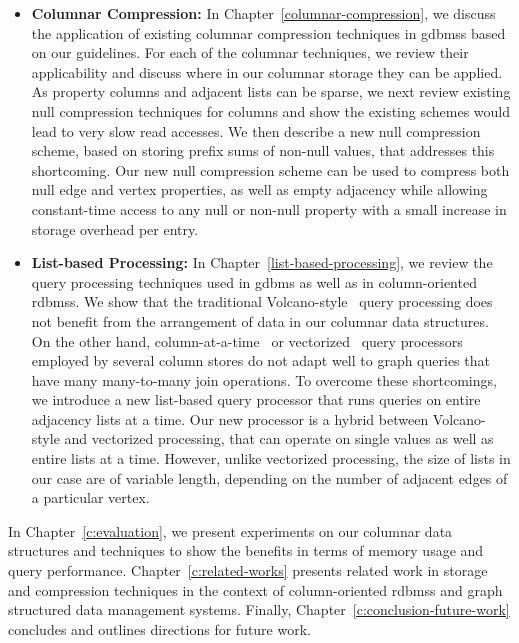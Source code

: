 \begin{itemize}
	\item \textbf{Columnar Compression:} In Chapter~\ref{columnar-compression}, we discuss the application of existing columnar compression techniques in \gls{gdbms}s based on our guidelines. For each of the columnar techniques, we review their applicability and discuss where in our columnar storage they can be applied. As property columns and adjacent lists can be sparse, we next review existing null compression techniques for columns and show the existing schemes would lead to very slow read accesses. We then describe a new null compression scheme, based on storing prefix sums of non-null values, that addresses this shortcoming. Our new null compression scheme can be used to compress both null edge and vertex properties, as well as empty adjacency while allowing constant-time access to any null or non-null property with a small increase in storage overhead per entry. 
	
	\item \textbf{List-based Processing:} In Chapter~\ref{list-based-processing}, we review the query processing techniques used in \gls{gdbms} as well as in column-oriented \gls{rdbms}s. We show that the traditional  Volcano-style~\cite{volcano} query processing does not benefit from the arrangement of data in our columnar data structures. On the other hand, column-at-a-time~\cite{col-vs-row} or vectorized~\cite{boncz-vectorwise1} query processors employed by several column stores do not adapt well to graph queries that have many many-to-many join operations. To overcome these shortcomings, we introduce a new list-based query processor that runs queries on entire adjacency lists at a time. Our new processor is a hybrid between Volcano-style and vectorized processing, that can operate on single values as well as entire lists at a time. However, unlike vectorized processing, the size of lists in our case are of variable length, depending on the number of adjacent edges of a particular vertex.
\end{itemize}

In Chapter~\ref{c:evaluation}, we present experiments on our columnar data structures and techniques to show the benefits in terms of memory usage and query performance. Chapter~\ref{c:related-works} presents related work in storage and compression techniques in the context of column-oriented \gls{rdbms}s and graph structured data management systems. Finally, Chapter~\ref{c:conclusion-future-work} concludes and outlines directions for future work.


